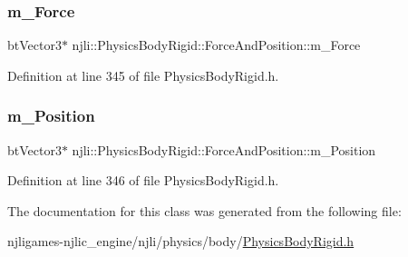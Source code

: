 \subsubsection{\texorpdfstring{m\+\_\+\+Force}{m\_Force}}
{\footnotesize\ttfamily bt\+Vector3$\ast$ njli\+::\+Physics\+Body\+Rigid\+::\+Force\+And\+Position\+::m\+\_\+\+Force\hspace{0.3cm}{\ttfamily [private]}}



Definition at line 345 of file Physics\+Body\+Rigid.\+h.

\mbox{\label{classnjli_1_1_physics_body_rigid_1_1_force_and_position_a15ddba07c93b2cfe06d8ab3e5a45f989}} 
\subsubsection{\texorpdfstring{m\+\_\+\+Position}{m\_Position}}
{\footnotesize\ttfamily bt\+Vector3$\ast$ njli\+::\+Physics\+Body\+Rigid\+::\+Force\+And\+Position\+::m\+\_\+\+Position\hspace{0.3cm}{\ttfamily [private]}}



Definition at line 346 of file Physics\+Body\+Rigid.\+h.



The documentation for this class was generated from the following file\+:\begin{DoxyCompactItemize}
\item 
njligames-\/njlic\+\_\+engine/njli/physics/body/\mbox{\hyperlink{_physics_body_rigid_8h}{Physics\+Body\+Rigid.\+h}}\end{DoxyCompactItemize}
